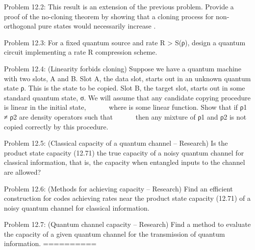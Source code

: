 \documentclass{article}
\newcommand{\0}{{$|0\rangle$}}
\newcommand{\1}{{$|1\rangle$}}
\newcommand{\2}{\frac{1}{\sqrt{2}}}
\begin{document}
Problem 12.2: This result is an extension of the previous problem. Provide a proof of the no-cloning theorem by showing that a cloning process for non-orthogonal pure states would necessarily increase .

Problem 12.3: For a fixed quantum source and rate R > S(ρ), design a quantum circuit implementing a rate R compression scheme.

Problem 12.4: (Linearity forbids cloning) Suppose we have a quantum machine with two slots, A and B. Slot A, the data slot, starts out in an unknown quantum state ρ. This is the state to be copied. Slot B, the target slot, starts out in some standard quantum state, σ. We will assume that any candidate copying procedure is linear in the initial state,       where is some linear function. Show that if ρ1 ≠ ρ2 are density operators such that       then any mixture of ρ1 and ρ2 is not copied correctly by this procedure.

Problem 12.5: (Classical capacity of a quantum channel – Research) Is the product state capacity (12.71) the true capacity of a noisy quantum channel for classical information, that is, the capacity when entangled inputs to the channel are allowed?

Problem 12.6: (Methods for achieving capacity – Research) Find an efficient construction for codes achieving rates near the product state capacity (12.71) of a noisy quantum channel for classical information.

Problem 12.7: (Quantum channel capacity – Research) Find a method to evaluate the capacity of a given quantum channel for the transmission of quantum information.
==========
\end{document}
